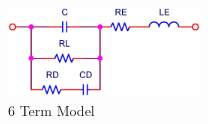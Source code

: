 \begin{figure}[ht!]
\ifisPPT
\noindent{}
\else
\includegraphics[keepaspectratio=true,width=2in]{./figures/regression/fullModel.jpg}
\fi
\centering
\caption{6 Term Model}
\label{fig:fullModel}
\end{figure}

